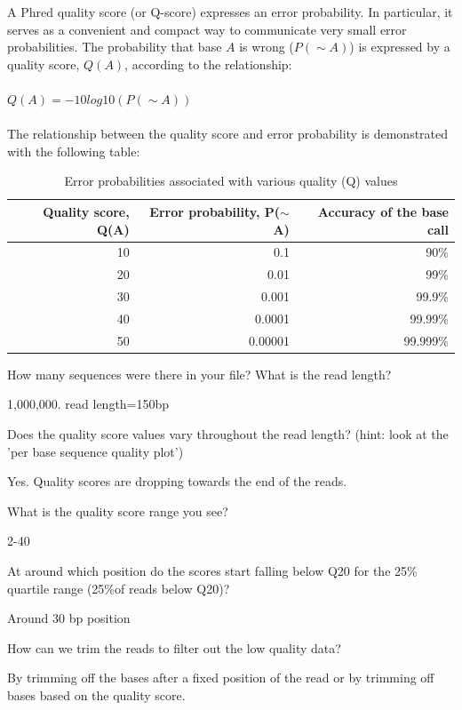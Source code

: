 \begin{information}
A Phred quality score (or Q-score) expresses an error probability.  In particular, it
serves as a convenient and compact way to communicate very small error
probabilities.
The probability that base $A$ is wrong ($P(\sim A)$) is expressed
by a quality score, $Q(A)$, according to the relationship:
\\\\
$Q(A) =-10 log10(P(\sim A))$
\\\\
The relationship between the quality score and error probability is demonstrated
with the following table:

\begin{table}[H]
  \centering
  \caption{Error probabilities associated with various quality (Q) values}
    \begin{tabular}{rrr}
    \toprule
    \textbf{Quality score, Q(A)} & \textbf{Error probability, P($\sim$A)} & \textbf{Accuracy of the base call} \\
    \midrule
    10    & 0.1     & 90\% \\
    20    & 0.01    & 99\% \\
    30    & 0.001   & 99.9\% \\
    40    & 0.0001  & 99.99\% \\
    50    & 0.00001 & 99.999\% \\
    \bottomrule
    \end{tabular}
  \label{tab:quality_error_probs}
\end{table}

\end{information}

\begin{questions}
How many sequences were there in your file? What is the read length?
\begin{answer}
1,000,000. read length=150bp
\end{answer}

Does the quality score values vary throughout the read length?
(hint: look at the 'per base sequence quality plot')
\begin{answer}
Yes. Quality scores are dropping towards the end of the reads.
\end{answer}

What is the quality score range you see?
\begin{answer}
2-40
\end{answer}

At around which position do the scores start falling below Q20 for the 25\% quartile range (25\%of reads below Q20)? 
\begin{answer}
Around 30 bp position
\end{answer}


How can we trim the reads to filter out the low quality data?
\begin{answer}
By trimming off the bases after a fixed position of the read or by trimming off
bases based on the quality score.
\end{answer}
\end{questions}

